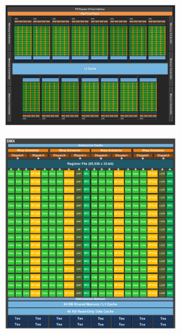 \begin{figure}[ht!]
 \begin{mdframed}
  \centering
  \begin{subfigure}[b]{0.7\textwidth}
    \centering
    \includegraphics[width=\textwidth]{images/kepler_arch.png}
    \caption{}
  \end{subfigure}
  \begin{subfigure}[b]{0.6\textwidth}
    \centering
    \includegraphics[width=\textwidth]{images/kepler_smx_arch.png}

\end{subfigure}
\end{mdframed}
\end{figure}
